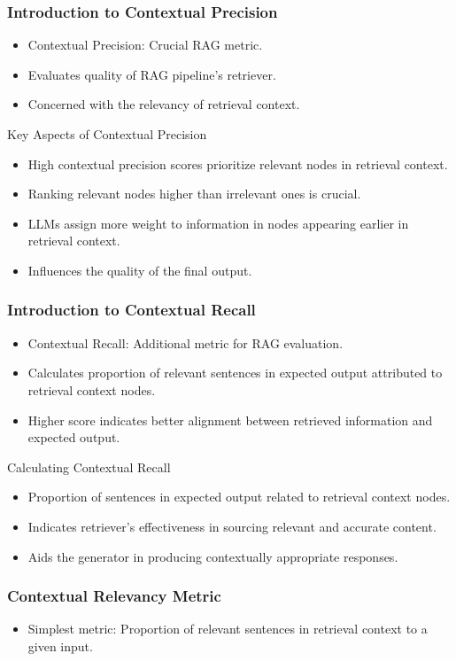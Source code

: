 \begin{frame}[fragile]\frametitle{Introduction to Contextual Precision}
  \begin{itemize}
    \item Contextual Precision: Crucial RAG metric.
    \item Evaluates quality of RAG pipeline's retriever.
    \item Concerned with the relevancy of retrieval context.
  \end{itemize}
Key Aspects of Contextual Precision
  \begin{itemize}
    \item High contextual precision scores prioritize relevant nodes in retrieval context.
    \item Ranking relevant nodes higher than irrelevant ones is crucial.
    \item LLMs assign more weight to information in nodes appearing earlier in retrieval context.
    \item Influences the quality of the final output.
  \end{itemize}
\end{frame}

\begin{frame}[fragile]\frametitle{Introduction to Contextual Recall}
  \begin{itemize}
    \item Contextual Recall: Additional metric for RAG evaluation.
    \item Calculates proportion of relevant sentences in expected output attributed to retrieval context nodes.
    \item Higher score indicates better alignment between retrieved information and expected output.
  \end{itemize}
Calculating Contextual Recall
  \begin{itemize}
    \item Proportion of sentences in expected output related to retrieval context nodes.
    \item Indicates retriever's effectiveness in sourcing relevant and accurate content.
    \item Aids the generator in producing contextually appropriate responses.
  \end{itemize}
\end{frame}

\begin{frame}[fragile]\frametitle{Contextual Relevancy Metric}
  \begin{itemize}
    \item Simplest metric: Proportion of relevant sentences in retrieval context to a given input.
  \end{itemize}
\end{frame}

